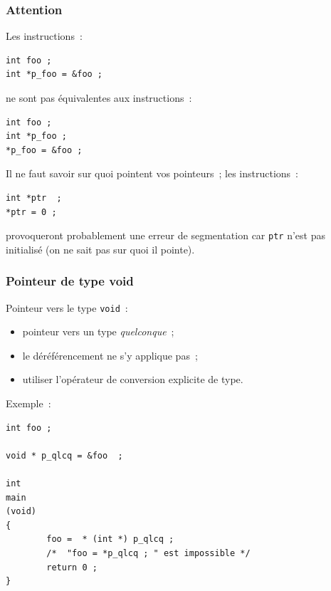 \begin{frame}[fragile]
  \frametitle{Attention}
  Les instructions~:
\begin{verbatim}
int foo ;
int *p_foo = &foo ;
\end{verbatim}
  ne sont pas \'equivalentes aux instructions~:
\begin{verbatim}
int foo ;
int *p_foo ;
*p_foo = &foo ;
\end{verbatim}
  \par\bigskip
  Il ne faut savoir sur quoi pointent vos pointeurs~; les instructions~:
\begin{verbatim}
int *ptr  ;
*ptr = 0 ;
\end{verbatim}
  provoqueront probablement une erreur de segmentation car \verb+ptr+
  n'est pas initialis\'e (on ne sait pas sur quoi il pointe).
\end{frame}
\begin{frame}[fragile]
    \frametitle{Pointeur de type void}
    Pointeur vers le type {\tt void}~:
    \begin{itemize}
    \item pointeur vers un type \textit{quelconque}~;
    \item le d\'er\'ef\'erencement ne s'y applique pas~;
    \item utiliser l'op\'erateur de conversion explicite de type.
    \end{itemize}
    \par\bigskip\bigskip
    Exemple~:
\begin{verbatim}
int foo ;

void * p_qlcq = &foo  ;

int 
main
(void)
{
        foo =  * (int *) p_qlcq ;
        /*  "foo = *p_qlcq ; " est impossible */
        return 0 ;
}
\end{verbatim}
\end{frame}
